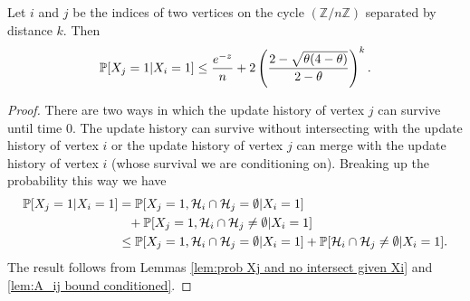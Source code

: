 	\begin{lemma}
		\label{lem:X_i+k given X_i}
		Let $i$ and $j$ be the indices of two vertices on the cycle $(\mathbb{Z}/n\mathbb{Z})$ separated by distance $k$. Then
		\begin{equation}
			\label{eq:prob X_i+k = 1|X_i = 1}
			\mathbb{P}[X_j = 1| X_i = 1] \leq \frac{e^{-z}}{n} + 2\left(\frac{2 - \sqrt{\theta(4 - \theta)}}{2 - \theta}\right)^k.
		\end{equation}
	\end{lemma}
	\begin{proof}
		There are two ways in which the update history of vertex $j$ can survive until time $0$. The update history can survive without intersecting with the update history of vertex $i$ or the update history of vertex $j$ can merge with the update history of vertex $i$ (whose survival we are conditioning on). %
		Breaking up the probability this way we have
		\begin{align}
			\prob[X_j = 1| X_i = 1] &= \prob[X_j = 1, \mathcal{H}_i \cap \mathcal{H}_j = \emptyset | X_i = 1] \notag\\
			&\phantom{=}+ \prob[X_j = 1, \mathcal{H}_i \cap \mathcal{H}_j \neq \emptyset | X_i = 1]\\
			&\leq \prob[X_j = 1, \mathcal{H}_i \cap \mathcal{H}_j = \emptyset | X_i = 1] %
			+ \prob[\mathcal{H}_i \cap \mathcal{H}_j \neq \emptyset | X_i = 1].
		\end{align}
		The result follows from Lemmas \ref{lem:prob Xj and no intersect given Xi} and \ref{lem:A_ij bound conditioned}.
	\end{proof}

